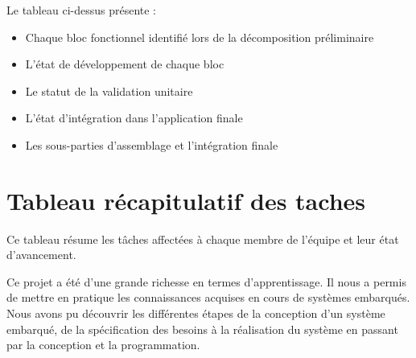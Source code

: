 \documentclass[12pt]{article}
\begin{document}
Le tableau ci-dessus présente :
\begin{itemize}
    \item Chaque bloc fonctionnel identifié lors de la décomposition préliminaire
    \item L'état de développement de chaque bloc
    \item Le statut de la validation unitaire
    \item L'état d'intégration dans l'application finale
    \item Les sous-parties d'assemblage et l'intégration finale
\end{itemize}


\section{Tableau récapitulatif des taches}
Ce tableau résume les tâches affectées à chaque membre de l'équipe et leur état d'avancement.

\begin{table}[htbp]
    \centering
    \caption{Tâches affectées et effectuées}
    \label{table:2}
\end{table}
\newpage
{}
Ce projet a été d'une grande richesse en termes d'apprentissage. Il nous a permis de mettre en pratique les connaissances acquises en cours de systèmes embarqués. Nous avons pu découvrir les différentes étapes de la conception d'un système embarqué, de la spécification des besoins à la réalisation du système en passant par la conception et la programmation.
\end{document}
